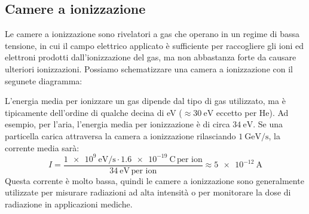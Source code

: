 \subsection{Camere a ionizzazione}
Le camere a ionizzazione sono rivelatori a gas che operano in un regime di bassa tensione, in cui il campo elettrico applicato è sufficiente per raccogliere gli ioni ed elettroni prodotti dall'ionizzazione del gas, ma non abbastanza forte da causare ulteriori ionizzazioni. Possiamo schematizzare una camera a ionizzazione con il segunete diagramma:


L'energia media per ionizzare un gas dipende dal tipo di gas utilizzato, ma è tipicamente dell'ordine di qualche decina di eV ($\approx \qty{30}{\electronvolt}$ eccetto per He). Ad esempio, per l'aria, l'energia media per ionizzazione è di circa $\qty{34}{\electronvolt}$. Se una particella carica attraversa la camera a ionizzazione rilasciando $\qty{1}{\giga\electronvolt\per\second}$, la corrente media sarà:
\begin{equation}
    I = \dfrac{\qty{1e9}{\electronvolt\per\second} \cdot \qty{1.6e-19}{\coulomb}\,\text{per ion}}{\qty{34}{\electronvolt}\,\text{per ion}} \approx \qty{5e-12}{\ampere}
\end{equation}
Questa corrente è molto bassa, quindi le camere a ionizzazione sono generalmente utilizzate per misurare radiazioni ad alta intensità o per monitorare la dose di radiazione in applicazioni mediche.
